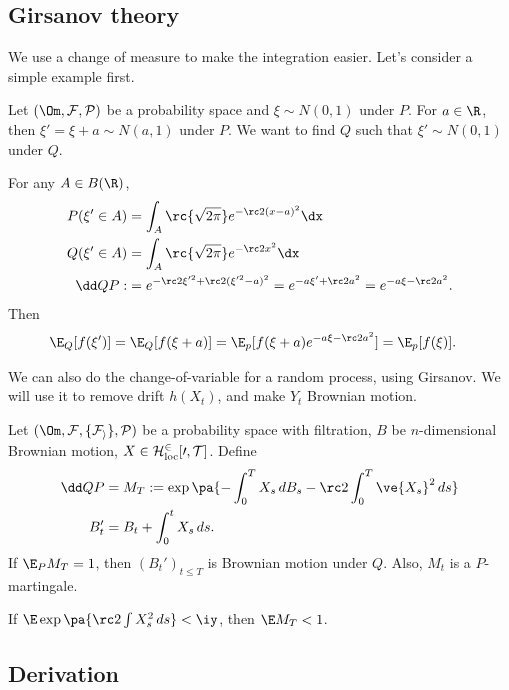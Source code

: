 \subsection{Girsanov theory}
We use a change of measure to make the integration easier.
Let's consider a simple example first.
\begin{ex}
Let $(\Om,\cal F,P)$ be a probability space and $\xi\sim N(0,1)$ under $P$. For $a\in \R$, then $\xi'=\xi+a\sim N(a,1)$ under $P$. We want to find $Q$ such that $\xi'\sim N(0,1)$ under $Q$. 

For any $A\in B(\R)$, 
\begin{align}
P(\xi'\in A) &=\int_A \rc{\sqrt{2\pi}} e^{-\rc 2(x-a)^2}\dx\\
Q(\xi'\in A) &=\int_A \rc{\sqrt{2\pi}}e^{-\rc 2x^2}\dx\\
\dd QP :&= e^{-\rc 2 \xi^{\prime2} +\rc 2(\xi^{\prime2}-a)^2} = e^{-a\xi' + \rc 2a^2} = e^{-a\xi-\rc 2a^2}.
\end{align}
Then
\begin{align}
\E_Q[f(\xi')]&=\E_Q [f(\xi+a)] = \E_p[f(\xi+a)e^{-a\xi -\rc 2a^2}]=\E_p [f(\xi)].
\end{align}
\end{ex}
We can also do the change-of-variable for a random process, using Girsanov. We will use it to remove drift $h(X_t)$,  and make $Y_t$ Brownian motion.
\begin{thm}[Girsanov] Let $(\Om, \cal F, \{\cal F_i\}, P)$ be a probability space with filtration, $B$ be $n$-dimensional Brownian motion, $X\in \cal H_{\text{loc}}^2[0,T]$. Define 
\begin{align}
\dd QP &= M_T:= \exp\pa{-\int_0^T X_s\,dB_s - \rc 2 \int_0^T \ve{X_s}^2\,ds}\\
B_t'&=B_t+\int_0^t X_s\,ds.
\end{align}
If $\E_PM_T=1$, then $(B_t')_{t\le T}$ is Brownian motion under $Q$. Also, $M_t$ is a $P$-martingale. 
\end{thm}
\begin{rem}[Novikov]
If $\E\exp\pa{\rc 2\int X_s^2\,ds}<\iy$, then $\E M_T<1$.
\end{rem}


\subsection{Derivation}

